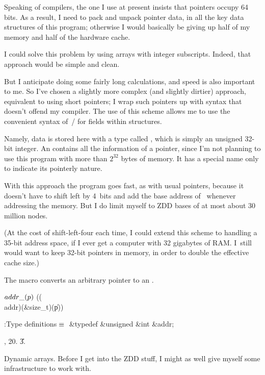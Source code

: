 Speaking of compilers, the one I use at present insists that
pointers occupy 64 bits. As a result, I need to pack and unpack
pointer data, in all the key data structures of this program;
otherwise I would basically be giving up half of my memory and half
of the hardware cache.

I could solve this problem by using arrays with integer subscripts.
Indeed, that approach would be simple and clean.

But I anticipate doing some fairly long calculations, and
speed is also important to me. So I've chosen a slightly more
complex (and slightly dirtier) approach, equivalent to using
short pointers; I wrap such pointers up with syntax that doesn't
offend my compiler. The use of this scheme allows me to use
the convenient syntax of~\CEE/ for fields within structures.

Namely, data is stored here with a type called , which is simply
an unsigned 32-bit integer. An  contains
all the information of a pointer, since I'm not planning to use
this program with more than $2^{32}$ bytes of memory.
It has a special name only to indicate its pointerly nature.

With this approach the program goes fast, as with usual pointers,
because it doesn't have to shift left by 4~bits and add the base
address of~ whenever addressing the memory. But I do limit
myself to ZDD bases of at most about 30 million nodes.

(At the cost of shift-left-four each time, I could extend this
scheme to handling a 35-bit address space, if I ever get a
computer with 32 gigabytes of RAM. I~still would want to keep
32-bit pointers in memory, in order to double the effective cache size.)

The  macro converts an arbitrary pointer to an .

\Y\B\4\D$\\{addr\_}(\|p)$ \5
((\\{addr})(\&{size\_t})(\|p))\par
\Y\B\4:Type definitions\X${}\equiv{}$\6
\&{typedef} \&{unsigned} \&{int} \&{addr};\par
{}, 20.
\U3.\fi

Dynamic arrays. Before I get into the ZDD stuff, I might as well
give myself some infrastructure to work with.

